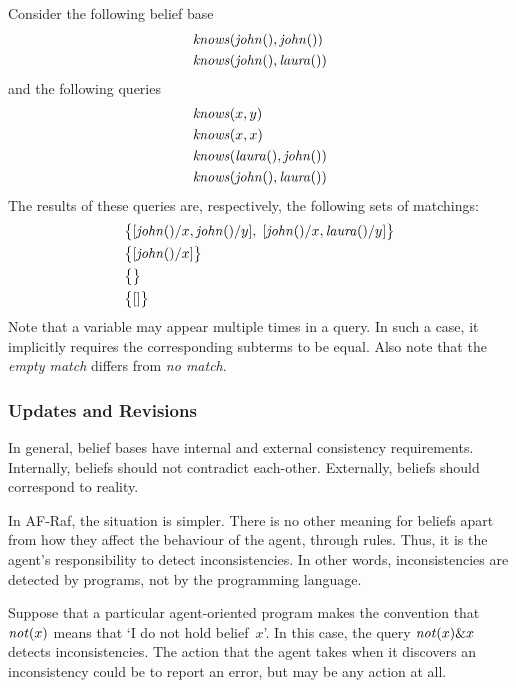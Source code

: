 \documentclass[a4paper,12pt,oneside,fleqn]{book} %
\newcommand{\todo}[1]{[\textcolor{red}{TODO}: #1]}
\begin{document}
\begin{example} Consider the following belief base \begin{align} &{\it
knows}({\it john}(), {\it john}()) \\ &{\it knows}({\it john}(), {\it
laura}()) \end{align} and the following queries \begin{align} &{\it
knows}(x, y) \\ &{\it knows}(x, x) \\ &{\it knows}({\it laura}(), {\it
john}()) \\ &{\it knows}({\it john}(), {\it laura}()) \end{align} The
results of these queries are, respectively, the following sets of
matchings: \begin{align} &\bigl\{ [{\it john}()/x, {\it john}()/y],\; [{\it
john}()/x,{\it laura}()/y] \bigr\} \\ &\bigl\{ [{\it john}()/x] \bigr\} \\
&\bigl\{\bigr\} \\ &\bigl\{[]\bigr\} \end{align} Note that a variable may
appear multiple times in a query.  In such a case, it implicitly requires
the corresponding subterms to be equal.  Also note that the \emph{empty
match} differs from \emph{no match}.
\end{example}


\subsubsection{Updates and Revisions}

In general, belief bases have internal and external consistency
requirements.  Internally, beliefs should not contradict each-other.
Externally, beliefs should correspond to reality.

In AF-Raf, the situation is simpler.  There is no other meaning for beliefs
apart from how they affect the behaviour of the agent, through rules.
Thus, it is the agent's responsibility to detect inconsistencies.  In other
words, inconsistencies are detected by programs, not by the programming
language.

\begin{example} Suppose that a particular agent-oriented program makes the
convention that ${\it not}(x)$ means that `I do not hold belief~$x$'.  In
this case, the query ${\it not}(x)\&x$ detects inconsistencies.  The action
that the agent takes when it discovers an inconsistency could be to report
an error, but may be any action at all.  \end{example}
\end{document}
